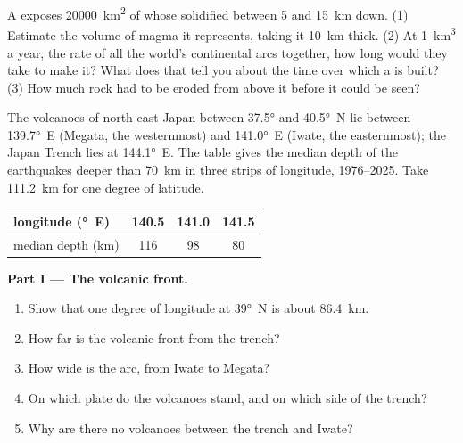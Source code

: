 \begin{exercise}[$\star\star\star$]\label{exo:g12:subduction-magmatism:15}
A  exposes \qty{20000}{km^2} of  whose 
solidified between 5 and \qty{15}{km} down. (1) Estimate the volume of magma
it represents, taking it \qty{10}{km} thick. (2) At \qty{1}{km^3} a year,
the rate of all the world's continental arcs together, how long would they
take to make it? What does that tell you about the time over which a
 is built?
(3) How much rock had to be eroded from above it before it could be seen?
\end{exercise}

\begin{problem}
\label{pb:g12:subduction-magmatism:1}
The volcanoes of north-east Japan between \ang{37.5} and \ang{40.5}~N lie
between \ang{139.7}~E (Megata, the westernmost) and \ang{141.0}~E (Iwate, the
easternmost); the Japan Trench lies at \ang{144.1}~E. The table gives the
median depth of the earthquakes deeper than \qty{70}{km} in three strips of
longitude, 1976--2025. Take \qty{111.2}{km} for one degree of latitude.

\begin{center}
\small
\begin{tabular}{|l|c|c|c|}
\hline
longitude (\unit{\degree}~E) & 140.5 & 141.0 & 141.5 \\ \hline
median depth (\unit{km}) & 116 & 98 & 80 \\ \hline
\end{tabular}
\end{center}

\medskip
\noindent\textbf{Part I --- The volcanic front.}
\begin{enumerate}
  \item Show that one degree of longitude at \ang{39}~N is about
        \qty{86.4}{km}.
  \item How far is the volcanic front from the trench?
  \item How wide is the arc, from Iwate to Megata?
  \item On which plate do the volcanoes stand, and on which side of the
        trench?
  \item Why are there no volcanoes between the trench and Iwate?
\end{enumerate}


\end{problem}
